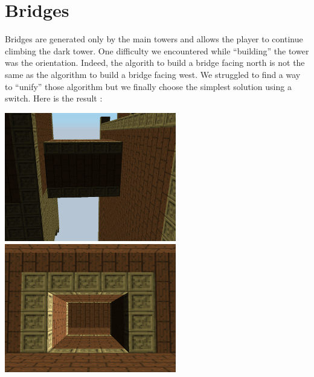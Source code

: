 \documentclass[article]{report}             %
\begin{document}
			\section{Bridges}
				Bridges are generated only by the main towers and allows the player to continue climbing the dark tower. One difficulty we encountered while ``building'' the tower was the orientation. Indeed, the algorith to build a bridge facing north is not the same as the algorithm to build a bridge facing west. We struggled to find a way to ``unify'' those algorithm but we finally choose the simplest solution using a switch. Here is the result :
				\begin{center}
					\includegraphics[width=7.5cm]{images/DT/bridge1.png}
					\includegraphics[width=7.5cm]{images/DT/bridge2.png}
				\end{center}
\end{document}
